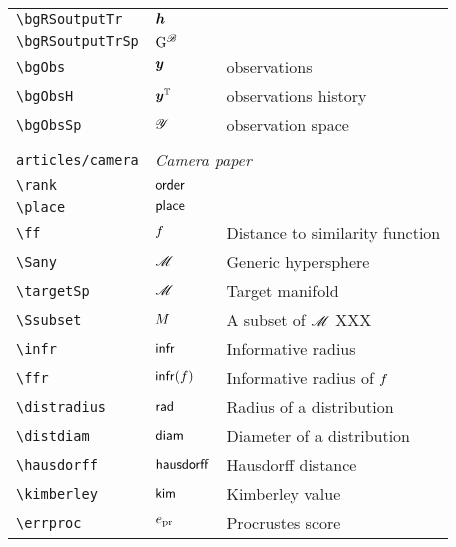 \begin{longtable}{lll}
 {\color[rgb]{0.5,0.5,0.5}\texttt{\textbackslash bgRSoutputTr}} & $\boldsymbol{h}$ &  \\ 
 {\color[rgb]{0.5,0.5,0.5}\texttt{\textbackslash bgRSoutputTrSp}} & $\mathrm{G}^{\mathscr{B}}$ & \\ 
 {\color[rgb]{0.5,0.5,0.5}\texttt{\textbackslash bgObs}} & $\boldsymbol{y}$ &  observations\\ 
 {\color[rgb]{0.5,0.5,0.5}\texttt{\textbackslash bgObsH}} & $\boldsymbol{y}^{\mathbb{T}}$ &  observations history\\ 
 {\color[rgb]{0.5,0.5,0.5}\texttt{\textbackslash bgObsSp}} & $\mathscr{Y}$ &  observation space\\ 
  &  & \\ 
 {\color[rgb]{0.5,0.5,0.5}\texttt{articles/camera}} & \multicolumn{2}{l}{\emph{Camera paper}}\\ 
 \hline
{\color[rgb]{0.5,0.5,0.5}\texttt{\textbackslash rank}} & $\mathsf{order}$ & \\ 
 {\color[rgb]{0.5,0.5,0.5}\texttt{\textbackslash place}} & $\mathsf{place}$ & \\ 
 {\color[rgb]{0.5,0.5,0.5}\texttt{\textbackslash ff}} & $f$ &  Distance to similarity function\\ 
 {\color[rgb]{0.5,0.5,0.5}\texttt{\textbackslash Sany}} & $\mathscr{M}$ &  Generic hypersphere\\ 
 {\color[rgb]{0.5,0.5,0.5}\texttt{\textbackslash targetSp}} & $\mathscr{M}$ &  Target manifold\\ 
 {\color[rgb]{0.5,0.5,0.5}\texttt{\textbackslash Ssubset}} & $M$ &  A subset of $\mathscr{M}$  XXX\\ 
 {\color[rgb]{0.5,0.5,0.5}\texttt{\textbackslash infr}} & $\mathsf{infr}$ &  Informative radius\\ 
 {\color[rgb]{0.5,0.5,0.5}\texttt{\textbackslash ffr}} & $\mathsf{infr}(f)$ &  Informative radius of $f$\\ 
 {\color[rgb]{0.5,0.5,0.5}\texttt{\textbackslash distradius}} & $\mathsf{rad}$ &  Radius of a distribution\\ 
 {\color[rgb]{0.5,0.5,0.5}\texttt{\textbackslash distdiam}} & $\mathsf{diam}$ &  Diameter of a distribution\\ 
 {\color[rgb]{0.5,0.5,0.5}\texttt{\textbackslash hausdorff}} & $\mathsf{hausdorff}$ &  Hausdorff distance\\ 
 {\color[rgb]{0.5,0.5,0.5}\texttt{\textbackslash kimberley}} & $\mathsf{kim}$ &  Kimberley value\\ 
 {\color[rgb]{0.5,0.5,0.5}\texttt{\textbackslash errproc}} & $e_{\textrm{pr}}$ &  Procrustes score\\ 

\end{longtable}
